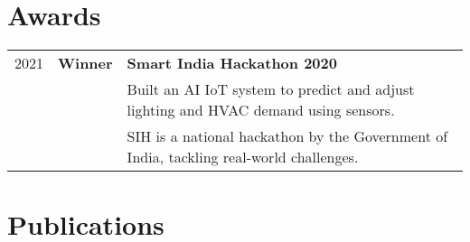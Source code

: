 \documentclass[]{deedy-resume-openfont}
\begin{document}
\begin{minipage}[t]{0.98\textwidth}




\section{Awards} 
\begin{tabular}{rll}
2021 & \textbf{Winner} & \textbf{Smart India Hackathon 2020} \\
     & & Built an AI IoT system to predict and adjust lighting and HVAC demand using sensors. \\
     & & SIH is a national hackathon by the Government of India, tackling real-world challenges.
\end{tabular}
\sectionsep

\end{minipage} 


\section{Publications} 
\renewcommand\refname{\vskip -1.5em} %


\nocite{*}
\end{document}
